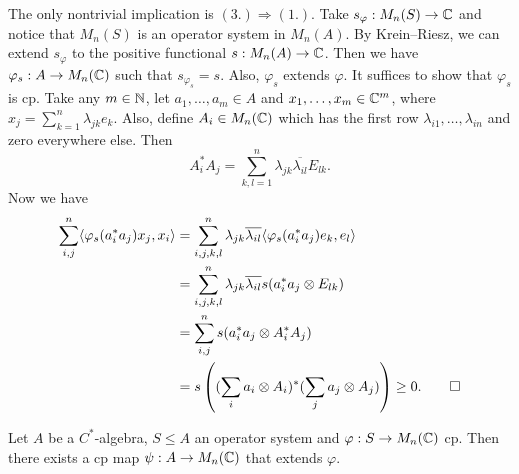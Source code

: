 \begin{myproof}
    The only nontrivial implication is $(3.) \Rightarrow (1.)$.
    Take $s_\varphi : M_n (S) \to \mathbb {C}$ and notice that $M_n (S)$ is an operator system in $M_n (A)$.
    By Krein--Riesz, we can extend $s_{\varphi}$ to the positive functional $s: M_n (A) \to \mathbb {C}$.
    Then we have $\varphi_s : A \to M_n (\mathbb {C})$ such that $s_{\varphi_s} = s$.
    Also, $\varphi_s$ extends $\varphi$. It suffices to show that $\varphi_s$ is cp.
    Take any $m \in \mathbb {N}$, let $a_1, \dots, a_m \in A$ and $x_1, \dots, x_m \in \mathbb {C}^m$, where 
    $x_j = \sum_{k = 1} ^n \lambda_{jk} e_k$. Also, define $A_i \in M_n (\mathbb {C})$ which has the first row 
    $\lambda_{i1}, \dots, \lambda_{in}$ and zero everywhere else.
    Then $$A_i ^* A_j = \sum_{k, l = 1} ^n \lambda_{jk} \overline{\lambda_{il}} E_{lk}.$$
    Now we have 
    \begin{align*}
        \sum_{i, j} ^n \langle \varphi_s (a_i ^* a_j) x_j, x_i \rangle &= \sum_{i, j, k, l}^{n} \lambda_{jk} \overline{\lambda_{il}} \langle \varphi_s (a_i ^* a_j) e_{k}, e_l \rangle\\
        &= \sum_{i, j, k, l}^{n} \lambda_{jk} \overline{\lambda_{il}} s (a_i ^* a_j \otimes E_{lk})\\
        &= \sum_{i, j} ^n s(a_i ^* a_j \otimes A_i ^* A_j)\\
        &= s \left( (\sum_i a_i \otimes A_i)^* (\sum_j a_j \otimes A_j)\right) \geq 0. \qedhere
    \end{align*}
\end{myproof}

\begin{corollary}\label{cor:7.1}
    Let $A$ be a $C^*$-algebra, $S \leq A$ an operator system and $\varphi: S \to M_n (\mathbb {C})$ cp.
    Then there exists a cp map $\psi: A \to M_n (\mathbb {C})$ that extends $\varphi$.
\end{corollary}

